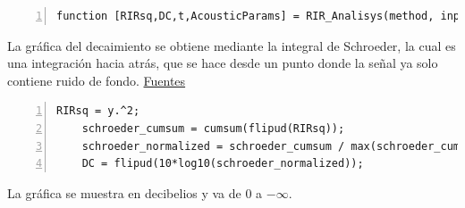 \begin{lstlisting}[frame=single,numbers=left, style=Matlab-editor, basicstyle=\tiny]
function [RIRsq,DC,t,AcousticParams] = RIR_Analisys(method, input, room_dimensions,printFlag)
\end{lstlisting}
La gráfica del decaimiento se obtiene mediante la integral de Schroeder, la cual es una integración hacia atrás, que se hace desde un punto donde la señal ya solo contiene ruido de fondo. \href{https://www.roomeqwizard.com/help/help_en-GB/html/graph_filteredir.html}{Fuentes}
\begin{lstlisting}[frame=single,numbers=left, style=Matlab-editor, basicstyle=\tiny]
    RIRsq = y.^2;
    schroeder_cumsum = cumsum(flipud(RIRsq));
    schroeder_normalized = schroeder_cumsum / max(schroeder_cumsum);
    DC = flipud(10*log10(schroeder_normalized));
\end{lstlisting}
La gráfica se muestra en decibelios y va de 0 a $-\infty$.

\newpage

